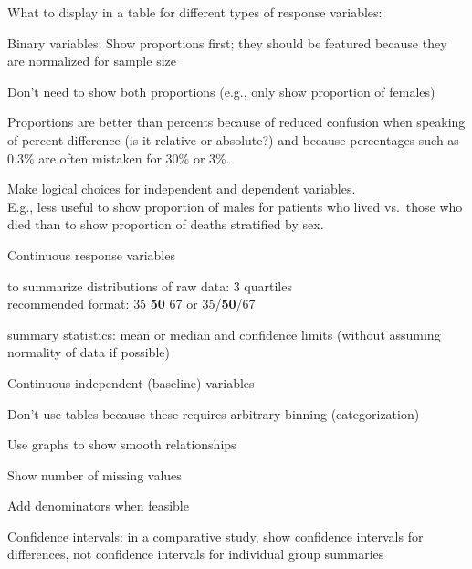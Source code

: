 What to display in a table for different types of response variables:
\bi
\item Binary variables: Show proportions first; they should be
  featured because they are normalized for sample size
  \bi
  \item Don't need to show both proportions (e.g., only show
    proportion of females)
  \item Proportions are better than percents because of reduced
    confusion when speaking of percent difference (is it relative or
    absolute?) and because percentages such as 0.3\% are often
    mistaken for 30\% or 3\%.
  \ei
\item Make logical choices for independent and dependent variables. \\
 E.g., less useful to show proportion of males for patients who lived
 vs.\ those who died than to show proportion of deaths stratified by
 sex.
\item Continuous response variables
 \bi
 \item to summarize distributions of raw data: 3 quartiles \\
   recommended format: {\small 35} \textbf{50} {\small 67} or
   35/\textbf{50}/67
 \item summary statistics: mean or median and confidence limits
   (without assuming normality of data if possible)
 \ei
\item Continuous independent (baseline) variables
  \bi
  \item Don't use tables because these requires arbitrary binning
    (categorization) 
  \item Use graphs to show smooth relationships
  \ei
\item Show number of missing values
\item Add denominators when feasible
\item Confidence intervals: in a comparative study, show confidence
  intervals for differences, not confidence intervals for
  individual group summaries
\ei

